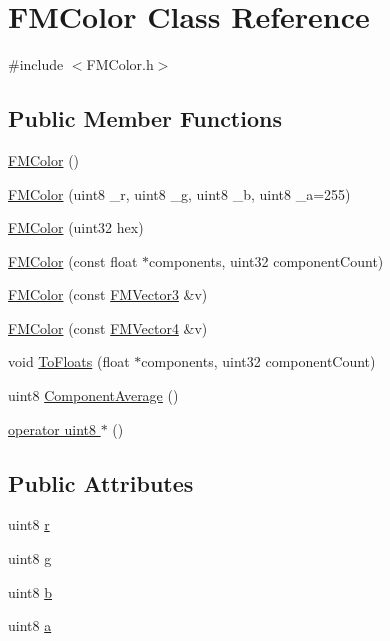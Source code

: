 \hypertarget{classFMColor}{
\section{FMColor Class Reference}
\label{classFMColor}
}


{\ttfamily \#include $<$FMColor.h$>$}

\subsection*{Public Member Functions}
\begin{DoxyCompactItemize}
\item 
\hyperlink{classFMColor_a9acb710671c50f603c90e06ec2ed86b8}{FMColor} ()
\item 
\hyperlink{classFMColor_aee3407cc1b6df36919c3199e428bcb36}{FMColor} (uint8 \_\-r, uint8 \_\-g, uint8 \_\-b, uint8 \_\-a=255)
\item 
\hyperlink{classFMColor_aed846f140eef6e7379d2a4d7e11e0ce3}{FMColor} (uint32 hex)
\item 
\hyperlink{classFMColor_ae3df0928bc78ec430804397fd47e8df5}{FMColor} (const float $\ast$components, uint32 componentCount)
\item 
\hyperlink{classFMColor_a07b3d5e6216562e8ebf74a945a258dec}{FMColor} (const \hyperlink{classFMVector3}{FMVector3} \&v)
\item 
\hyperlink{classFMColor_a47217e9d9c89a93123e44a7e080a74b8}{FMColor} (const \hyperlink{classFMVector4}{FMVector4} \&v)
\item 
void \hyperlink{classFMColor_a89dcfa30dd18ff55c4aa79504fcabf24}{ToFloats} (float $\ast$components, uint32 componentCount)
\item 
uint8 \hyperlink{classFMColor_a911f0f47225a8c9c89246dd01280f789}{ComponentAverage} ()
\item 
\hyperlink{classFMColor_a4cbe7fa247d38162d700fabe70240b0a}{operator uint8 $\ast$} ()
\end{DoxyCompactItemize}
\subsection*{Public Attributes}
\begin{DoxyCompactItemize}
\item 
uint8 \hyperlink{classFMColor_a36789d346608eb0c778d58204ea1f406}{r}
\item 
uint8 \hyperlink{classFMColor_a0868b26c7d46f6fd5fb753e63010c377}{g}
\item 
uint8 \hyperlink{classFMColor_aba4a975fc1d71d6f0065cf67f90d3c45}{b}
\item 
uint8 \hyperlink{classFMColor_a42355f56b082b874c5580a9b4625be7c}{a}
\end{DoxyCompactItemize}


